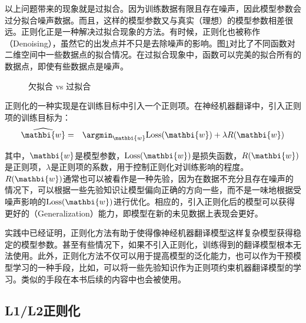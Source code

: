 \parinterval 以上问题带来的现象就是过拟合。因为训练数据有限且存在噪声，因此模型参数会过分拟合噪声数据。而且，这样的模型参数又与真实（理想）的模型参数相差很远。正则化正是一种解决过拟合现象的方法。有时候，正则化也被称作{\small{}}（Denoising），虽然它的出发点并不只是去除噪声的影响。图\ref{fig:13-4}对比了不同函数对二维空间中一些数据点的拟合情况。在过拟合现象中，函数可以完美的拟合所有的数据点，即使有些数据点是噪声。

\begin{figure}[htp]
\centering

\caption{欠拟合 vs 过拟合}
\label{fig:13-4}
\end{figure}

\parinterval 正则化的一种实现是在训练目标中引入一个正则项。在神经机器翻译中，引入正则项的训练目标为：
\begin{eqnarray}
\widehat{\mathbi{w}} &=& \argmin_{\mathbi{w}}\textrm{Loss}(\mathbi{w}) + \lambda R(\mathbi{w})
\label{eq:13-2}
\end{eqnarray}

\noindent 其中，$\mathbi{w}$是模型参数，$\textrm{Loss}(\mathbi{w})$是损失函数，$R(\mathbi{w})$是正则项，$\lambda$是正则项的系数，用于控制正则化对训练影响的程度。$R(\mathbi{w})$通常也可以被看作是一种先验，因为在数据不充分且存在噪声的情况下，可以根据一些先验知识让模型偏向正确的方向一些，而不是一味地根据受噪声影响的$\textrm{Loss}(\mathbi{w})$进行优化。相应的，引入正则化后的模型可以获得更好的{\small{}}（Generalization）能力，即模型在新的未见数据上表现会更好。

\parinterval 实践中已经证明，正则化方法有助于使得像神经机器翻译模型这样复杂模型获得稳定的模型参数。甚至有些情况下，如果不引入正则化，训练得到的翻译模型根本无法使用。此外，正则化方法不仅可以用于提高模型的泛化能力，也可以作为干预模型学习的一种手段，比如，可以将一些先验知识作为正则项约束机器翻译模型的学习。类似的手段在本书后续的内容中也会被使用。


\subsection{L1/L2正则化}

